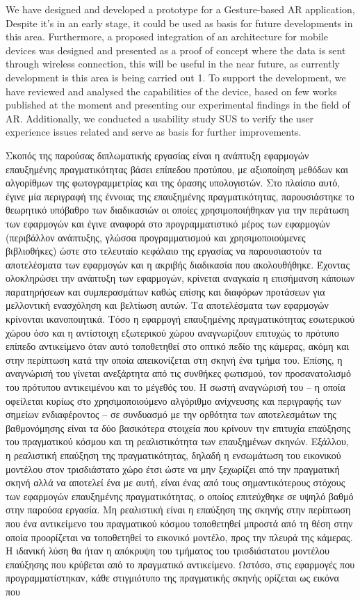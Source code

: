We have designed and developed a prototype for a Gesture-based AR application, Despite it’s in an early stage, it could be used as basis for future developments in this area. Furthermore, a proposed integration of an architecture for mobile devices was designed and presented as a proof of concept where the data is sent through wireless connection, this will be useful in the near future, as currently development is this area is being carried out 1. To support the development, we have reviewed and analysed the capabilities of the device, based on few works published at the moment and presenting our experimental findings in the field of AR. Additionally, we conducted a usability study SUS to verify the user experience issues related and serve as basis for further improvements.

Σκοπός της παρούσας διπλωματικής εργασίας είναι η ανάπτυξη εφαρμογών επαυξημένης πραγματικότητας βάσει επίπεδου προτύπου, με αξιοποίηση μεθόδων και αλγορίθμων της φωτογραμμετρίας και της όρασης υπολογιστών. Στο πλαίσιο αυτό, έγινε μία περιγραφή της έννοιας της επαυξημένης πραγματικότητας, παρουσιάστηκε το θεωρητικό υπόβαθρο των διαδικασιών οι οποίες χρησιμοποιήθηκαν για την περάτωση των εφαρμογών και έγινε αναφορά στο προγραμματιστικό μέρος των εφαρμογών (περιβάλλον ανάπτυξης, γλώσσα προγραμματισμού και χρησιμοποιούμενες βιβλιοθήκες) ώστε στο τελευταίο κεφάλαιο της εργασίας να παρουσιαστούν τα αποτελέσματα των εφαρμογών και η ακριβής διαδικασία που ακολουθήθηκε. Έχοντας ολοκληρώσει την ανάπτυξη των εφαρμογών, κρίνεται αναγκαία η επισήμανση κάποιων παρατηρήσεων και συμπερασμάτων καθώς επίσης και διαφόρων προτάσεων για μελλοντική ενασχόληση και βελτίωση αυτών. Τα αποτελέσματα των εφαρμογών κρίνονται ικανοποιητικά. Τόσο η εφαρμογή επαυξημένης πραγματικότητας εσωτερικού χώρου όσο και η αντίστοιχη εξωτερικού χώρου αναγνωρίζουν επιτυχώς το πρότυπο επίπεδο αντικείμενο όταν αυτό τοποθετηθεί στο οπτικό πεδίο της κάμερας, ακόμη και στην περίπτωση κατά την οποία απεικονίζεται στη σκηνή ένα τμήμα του. Επίσης, η αναγνώρισή του γίνεται ανεξάρτητα από τις συνθήκες φωτισμού, τον προσανατολισμό του πρότυπου αντικειμένου και το μέγεθός του. Η σωστή αναγνώρισή του – η οποία οφείλεται κυρίως στο χρησιμοποιούμενο αλγόριθμο ανίχνευσης και περιγραφής των σημείων ενδιαφέροντος – σε συνδυασμό με την ορθότητα των αποτελεσμάτων της βαθμονόμησης είναι τα δύο βασικότερα στοιχεία που κρίνουν την επιτυχία επαύξησης του πραγματικού κόσμου και τη ρεαλιστικότητα των επαυξημένων σκηνών. Εξάλλου, η ρεαλιστική επαύξηση της πραγματικότητας, δηλαδή η ενσωμάτωση του εικονικού μοντέλου στον τρισδιάστατο χώρο έτσι ώστε να μην ξεχωρίζει από την πραγματική σκηνή αλλά να αποτελεί ένα με αυτή, είναι ένας από τους σημαντικότερους στόχους των εφαρμογών επαυξημένης πραγματικότητας, ο οποίος επιτεύχθηκε σε υψηλό βαθμό στην παρούσα εργασία. Μη ρεαλιστική είναι η επαύξηση της σκηνής στην περίπτωση που ένα αντικείμενο του πραγματικού κόσμου τοποθετηθεί μπροστά από τη θέση στην οποία προορίζεται να τοποθετηθεί το εικονικό μοντέλο, προς την πλευρά της κάμερας. Η ιδανική λύση θα ήταν η απόκρυψη του τμήματος του τρισδιάστατου μοντέλου επαύξησης που κρύβεται από το πραγματικό αντικείμενο. Ωστόσο, στις εφαρμογές που προγραμματίστηκαν, κάθε στιγμιότυπο της πραγματικής σκηνής ορίζεται ως εικόνα που 